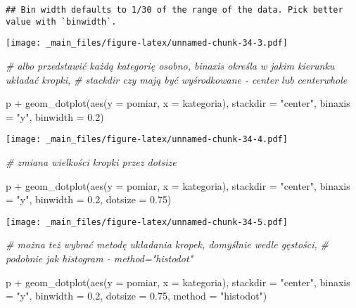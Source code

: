 \documentclass[
]{book}
\newenvironment{Shaded}{\begin{snugshade}}{\end{snugshade}}
\newcommand{\AttributeTok}[1]{\textcolor[rgb]{0.77,0.63,0.00}{#1}}
\newcommand{\CommentTok}[1]{\textcolor[rgb]{0.56,0.35,0.01}{\textit{#1}}}
\newcommand{\FloatTok}[1]{\textcolor[rgb]{0.00,0.00,0.81}{#1}}
\newcommand{\FunctionTok}[1]{\textcolor[rgb]{0.00,0.00,0.00}{#1}}
\newcommand{\NormalTok}[1]{#1}
\newcommand{\SpecialCharTok}[1]{\textcolor[rgb]{0.00,0.00,0.00}{#1}}
\newcommand{\StringTok}[1]{\textcolor[rgb]{0.31,0.60,0.02}{#1}}
\begin{document}
\begin{verbatim}
## Bin width defaults to 1/30 of the range of the data. Pick better value with `binwidth`.
\end{verbatim}

\texttt{[image: \_main\_files/figure-latex/unnamed-chunk-34-3.pdf]}

\begin{Shaded}
\begin{Highlighting}[]
\CommentTok{\# albo przedstawić każdą kategorię osobno, binaxis określa w jakim kierunku układać kropki,}
\CommentTok{\# stackdir czy mają być wyśrodkowane {-} center lub centerwhole}

\NormalTok{p }\SpecialCharTok{+} \FunctionTok{geom\_dotplot}\NormalTok{(}\FunctionTok{aes}\NormalTok{(}\AttributeTok{y =}\NormalTok{ pomiar, }\AttributeTok{x =}\NormalTok{ kategoria), }\AttributeTok{stackdir =} \StringTok{"center"}\NormalTok{, }\AttributeTok{binaxis =} \StringTok{"y"}\NormalTok{, }\AttributeTok{binwidth =} \FloatTok{0.2}\NormalTok{)}
\end{Highlighting}
\end{Shaded}

\texttt{[image: \_main\_files/figure-latex/unnamed-chunk-34-4.pdf]}

\begin{Shaded}
\begin{Highlighting}[]
\CommentTok{\# zmiana wielkości kropki przez dotsize}

\NormalTok{p }\SpecialCharTok{+} \FunctionTok{geom\_dotplot}\NormalTok{(}\FunctionTok{aes}\NormalTok{(}\AttributeTok{y =}\NormalTok{ pomiar, }\AttributeTok{x =}\NormalTok{ kategoria), }\AttributeTok{stackdir =} \StringTok{"center"}\NormalTok{, }\AttributeTok{binaxis =} \StringTok{"y"}\NormalTok{, }
                 \AttributeTok{binwidth =} \FloatTok{0.2}\NormalTok{, }\AttributeTok{dotsize =} \FloatTok{0.75}\NormalTok{)}
\end{Highlighting}
\end{Shaded}

\texttt{[image: \_main\_files/figure-latex/unnamed-chunk-34-5.pdf]}

\begin{Shaded}
\begin{Highlighting}[]
\CommentTok{\# można też wybrać metodę układania kropek, domyślnie wedle gęstości, }
\CommentTok{\# podobnie jak histogram {-} method="histodot"}

\NormalTok{p }\SpecialCharTok{+} \FunctionTok{geom\_dotplot}\NormalTok{(}\FunctionTok{aes}\NormalTok{(}\AttributeTok{y =}\NormalTok{ pomiar, }\AttributeTok{x =}\NormalTok{ kategoria), }\AttributeTok{stackdir =} \StringTok{"center"}\NormalTok{, }\AttributeTok{binaxis =} \StringTok{"y"}\NormalTok{, }
                 \AttributeTok{binwidth =} \FloatTok{0.2}\NormalTok{, }\AttributeTok{dotsize =} \FloatTok{0.75}\NormalTok{, }\AttributeTok{method =} \StringTok{"histodot"}\NormalTok{)}
\end{Highlighting}
\end{Shaded}
\end{document}
